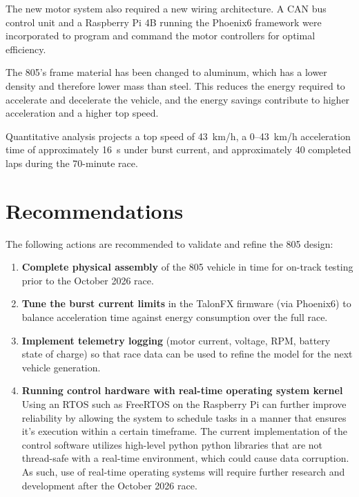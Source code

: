 \documentclass[12pt]{article}
\begin{document}
The new motor system also required a new wiring architecture. A CAN bus
control unit and a Raspberry Pi 4B running the Phoenix6 framework were
incorporated to program and command the motor controllers for optimal
efficiency.

The 805's frame material has been changed to aluminum, which has a lower
density and therefore lower mass than steel. This reduces the energy
required to accelerate and decelerate the vehicle, and the energy savings
contribute to higher acceleration and a higher top speed.

Quantitative analysis projects a top speed of 43~km/h, a 0--43~km/h
acceleration time of approximately 16~s under burst current, and
approximately 40 completed laps during the 70-minute race.

\section{Recommendations}

The following actions are recommended to validate and refine the 805
design:
\begin{enumerate}
  \item \textbf{Complete physical assembly} of the 805 vehicle in time for
        on-track testing prior to the October 2026 race.
  \item \textbf{Tune the burst current limits} in the TalonFX firmware
        (via Phoenix6) to balance acceleration time against energy
        consumption over the full race.
  \item \textbf{Implement telemetry logging} (motor current, voltage, RPM,
        battery state of charge) so that race data can be used to refine
        the model for the next vehicle generation.
  \item \textbf{Running control hardware with real-time operating system kernel} Using an RTOS such as FreeRTOS on the Raspberry Pi can further improve reliability by allowing the system to schedule tasks in a manner that ensures it's execution within a certain timeframe. The current implementation of the control software utilizes high-level python python libraries that are not thread-safe with a real-time environment, which could cause data corruption. As such, use of real-time operating systems will require further research and development after the October 2026 race.

\end{enumerate}
\end{document}
